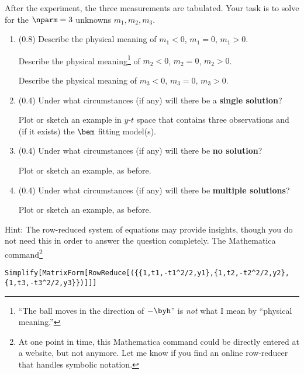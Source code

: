\documentclass[11pt,titlepage,fleqn]{article}
\begin{document}
%
After the experiment, the three measurements are tabulated.
Your task is to solve for the $\nparm=3$ unknowns $m_1, m_2, m_3$.
%
\begin{enumerate}
\item (0.8) Describe the physical meaning of $m_1 < 0$, $m_1 = 0$, $m_1 > 0$.

Describe the physical meaning\footnote{``The ball moves in the direction of $-\byh$'' is {\em not} what I mean by ``physical meaning.''} of $m_2 < 0$, $m_2 = 0$, $m_2 > 0$.

Describe the physical meaning of $m_3 < 0$, $m_3 = 0$, $m_3 > 0$.

\item (0.4) Under what circumstances (if any) will there be a {\bf single solution}?

Plot or sketch an example in $y$-$t$ space that contains three observations and (if it exists) the $\bem$ fitting model(s).

\item (0.4) Under what circumstances (if any) will there be {\bf no solution}?

Plot or sketch an example, as before.

\item (0.4) Under what circumstances (if any) will there be {\bf multiple solutions}?

Plot or sketch an example, as before.
\end{enumerate}

\pagebreak\noindent
Hint: The row-reduced system of equations may provide insights, though you do not need this in order to answer the question completely. The Mathematica command\footnote{At one point in time, this Mathematica command could be directly entered at a website, but not anymore. Let me know if you find an online row-reducer that handles symbolic notation.}

\begin{verbatim}
Simplify[MatrixForm[RowReduce[({{1,t1,-t1^2/2,y1},{1,t2,-t2^2/2,y2},{1,t3,-t3^2/2,y3}})]]]
\end{verbatim}
\end{document}

